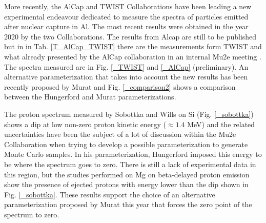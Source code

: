 \documentclass[12pt,a4paper,openright, oneside, titlepage]{book} %
\begin{document}
\noindent 
More recently, the AlCap \cite{AlCap:2018} and TWIST \cite{TWIST:2020} Collaborations 
have been leading a new experimental endeavour dedicated to measure the spectra 
of particles emitted after nuclear capture in Al. 
The most recent results were obtained in the year 2020 by the two Collaborations. The results from Alcap are still to be published but in in Tab. \ref{T_AlCap_TWIST} there are the measurements form TWIST and what already presented by the AlCap collaboration in an internal Mu2e meeting \cite{AlCap:2020}. The spectra measured are in Fig. \ref{_TWIST} and \ref{_AlCap} (preliminary). 
An alternative parameterization that takes into account the new results has been recently proposed by Murat \cite{Pasha:spectra} and Fig. \ref{_comparison2} \cite{io:comparison} shows a comparison between the Hungerford and Murat parameterizations.

\noindent The proton spectrum measured by Sobottka and Wills on Si (Fig. \ref{_sobottka}) shows a dip at low non-zero proton kinetic energy ($\approx 1.4$ MeV) and the related uncertainties have been the subject of a lot of  discussion within the Mu2e Collaboration \cite{io:sobottka} when trying to develop a possible parameterization to generate Monte Carlo samples. 
In his parameterization, Hungerford imposed this energy to be where the spectrum goes to zero.
There is still a lack of experimental data in this region, but the studies performed on Mg \cite{IDS:2016} on beta-delayed proton emission show the presence of ejected protons with energy lower than the dip shown in Fig. \ref{_sobottka}. 
These results support the choice of an alternative parameterization proposed by Murat this year that forces the zero point of the spectrum to zero.\\
\end{document}
